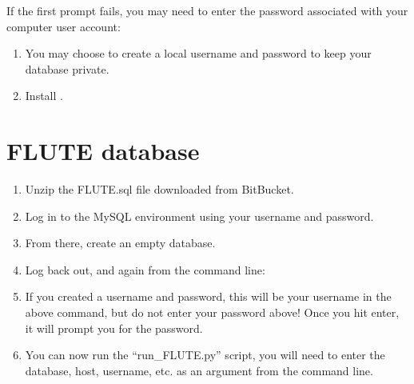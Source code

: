 \documentclass[a4paper,10pt,english]{sphinxmanual}
\begin{document}
\sphinxAtStartPar
If the first prompt fails, you may need to enter the password associated with your computer user account:

\begin{sphinxVerbatim}[commandchars=\\\{\}]
   
\end{sphinxVerbatim}
\begin{enumerate}
%
\setcounter{enumi}{2}
\item {} 
\sphinxAtStartPar
You may choose to create a local username and password to keep your database private.

\item {} 
\sphinxAtStartPar
Install .

\end{enumerate}


\section{FLUTE database}
\label{\detokenize{Installation:flute-database}}\begin{enumerate}
%
\item {} 
\sphinxAtStartPar
Un\sphinxhyphen{}zip the FLUTE.sql file downloaded from BitBucket.

\item {} 
\sphinxAtStartPar
Log in to the MySQL environment using your username and password.

\item {} 
\sphinxAtStartPar
From there, create an empty database.

\item {} 
\sphinxAtStartPar
Log back out, and again from the command line:

\begin{sphinxVerbatim}[commandchars=\\\{\}]
      
\end{sphinxVerbatim}

\item {} 
\sphinxAtStartPar
If you created a username and password, this will be your username in the above command, but do not enter your password above! Once you hit enter, it will prompt you for the password.

\item {} 
\sphinxAtStartPar
You can now run the “run\_FLUTE.py” script, you will need to enter the database, host, username, etc. as an argument from the command line.

\end{enumerate}
\end{document}
